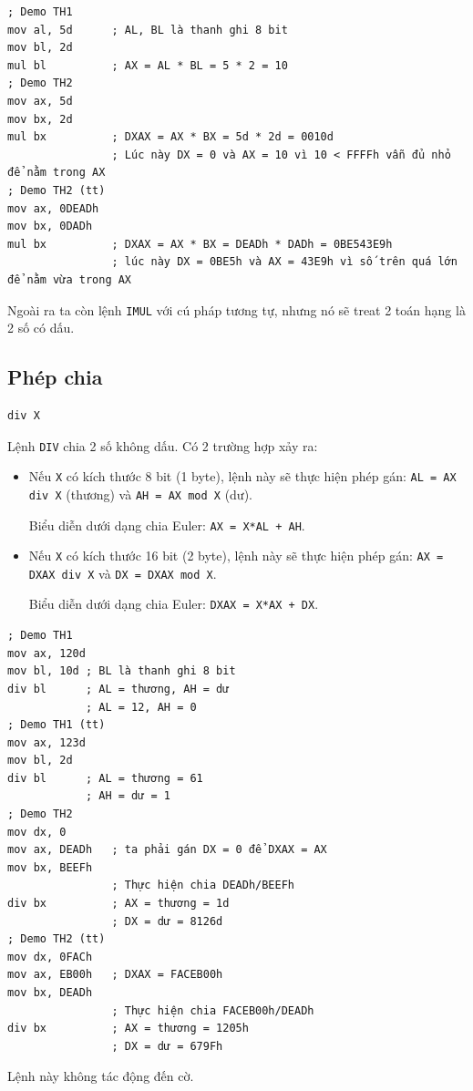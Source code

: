 \documentclass[12pt]{report}
\newcommand{\code}[1]{\texttt{#1}}
\begin{document}
\begin{verbatim}
; Demo TH1 
mov al, 5d      ; AL, BL là thanh ghi 8 bit
mov bl, 2d 
mul bl          ; AX = AL * BL = 5 * 2 = 10
; Demo TH2 
mov ax, 5d 
mov bx, 2d 
mul bx          ; DXAX = AX * BX = 5d * 2d = 0010d
                ; Lúc này DX = 0 và AX = 10 vì 10 < FFFFh vẫn đủ nhỏ để nằm trong AX
; Demo TH2 (tt)
mov ax, 0DEADh
mov bx, 0DADh
mul bx          ; DXAX = AX * BX = DEADh * DADh = 0BE543E9h
                ; lúc này DX = 0BE5h và AX = 43E9h vì số trên quá lớn để nằm vừa trong AX
\end{verbatim}

Ngoài ra ta còn lệnh \code{IMUL} với cú pháp tương tự, nhưng nó sẽ treat 2 toán hạng là 2 số có dấu.

\subsection{Phép chia}
\begin{verbatim}
div X
\end{verbatim}
Lệnh \code{DIV} chia 2 số không dấu.
Có 2 trường hợp xảy ra:
\begin{itemize}
    \item Nếu \code{X} có kích thước 8 bit (1 byte), lệnh này sẽ thực hiện phép gán: \code{AL = AX div X} (thương) và \code{AH = AX mod X} (dư).
    \par Biểu diễn dưới dạng chia Euler: \code{AX = X*AL + AH}.
    \item Nếu \code{X} có kích thước 16 bit (2 byte), lệnh này sẽ thực hiện phép gán: \code{AX = DXAX div X} và \code{DX = DXAX mod X}.
    \par Biểu diễn dưới dạng chia Euler: \code{DXAX = X*AX + DX}.
\end{itemize} 
\begin{verbatim}
; Demo TH1 
mov ax, 120d
mov bl, 10d ; BL là thanh ghi 8 bit 
div bl      ; AL = thương, AH = dư 
            ; AL = 12, AH = 0
; Demo TH1 (tt)
mov ax, 123d 
mov bl, 2d 
div bl      ; AL = thương = 61 
            ; AH = dư = 1
; Demo TH2 
mov dx, 0
mov ax, DEADh   ; ta phải gán DX = 0 để DXAX = AX 
mov bx, BEEFh 
                ; Thực hiện chia DEADh/BEEFh
div bx          ; AX = thương = 1d
                ; DX = dư = 8126d
; Demo TH2 (tt)
mov dx, 0FACh
mov ax, EB00h   ; DXAX = FACEB00h
mov bx, DEADh 
                ; Thực hiện chia FACEB00h/DEADh
div bx          ; AX = thương = 1205h
                ; DX = dư = 679Fh

\end{verbatim}
Lệnh này không tác động đến cờ.
\end{document}
